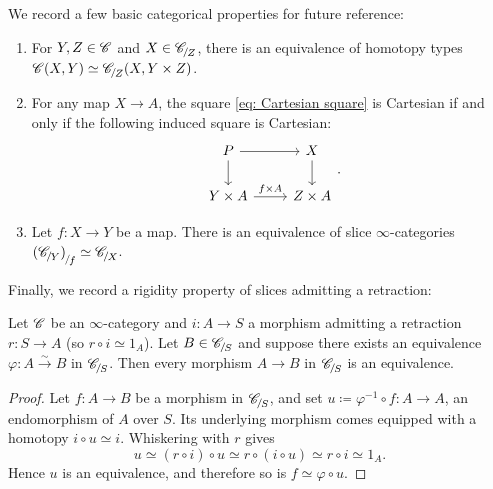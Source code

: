 \documentclass[twoside,a4paper,11pt]{amsart}
\begin{document}
We record a few basic categorical properties for future reference:
\begin{enumerate}
    \item\label{item: Hom C vs slice} For $Y,Z\in \mathscr{C}$ and $X\in\slice{\C}{Z}$, there is an equivalence of homotopy types $\C(X,Y)\simeq\slice{\C}{Z}(X,Y\times Z)$.
    \item\label{item: pullback of a product with X} For any map $X\to A$, the square \eqref{eq: Cartesian square} is Cartesian if and only if the following induced square is Cartesian:
\[\begin{tikzcd}
	P & X \\
	{Y\times A} & {Z\times A}
	\arrow[from=1-1, to=1-2]
	\arrow[from=1-1, to=2-1]
	\arrow[from=1-2, to=2-2]
	\arrow[from=2-1, to=2-2, "f\times A"]
\end{tikzcd}.\]
\item\label{item: Slice of slice} Let $f\colon X\to Y$ be a map. There is an equivalence of slice $\infty$-categories $\slice{(\slice{\C}{Y})}{f}\simeq\slice{\C}{X}$.
\end{enumerate}
Finally, we record a rigidity property of slices admitting a retraction:
\begin{lemma}\label{lemma: retract rigidity} 
    Let $\mathscr{C}$ be an $\infty$-category and $i\colon A\to S$ a morphism admitting a retraction $r\colon S\to A$ (so $r\circ i\simeq 1_A$). Let $B\in\slice{\C}{S}$ and suppose there exists an equivalence $\varphi\colon A\xrightarrow{\sim}B$ in $\slice{\C}{S}$. Then every morphism $A\to B$ in $\slice{\C}{S}$ is an equivalence.
\end{lemma}
\begin{proof}
    Let $f\colon A\to B$ be a morphism in $\slice{\C}{S}$, and set $u\coloneq \varphi ^{-1}\circ f\colon A\to A$, an endomorphism of $A$ over $S$. Its underlying morphism comes equipped with a homotopy $i\circ u\simeq i$. Whiskering with $r$ gives \[u\simeq (r\circ i)\circ u\simeq r\circ(i\circ u)\simeq r\circ i\simeq 1_A.\] Hence $u$ is an equivalence, and therefore so is $f\simeq\varphi\circ u$.
\end{proof}
\end{document}
